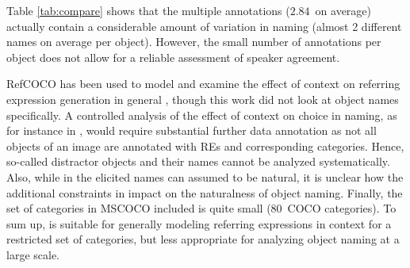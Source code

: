 Table \ref{tab:compare} shows that the multiple annotations ($2.84$\ on average) actually contain a considerable amount of variation in naming (almost 2 different names on average per object). However, the small number of annotations per object does not allow for a reliable assessment of speaker agreement. 

RefCOCO has been used to model and examine the effect of context on referring expression generation in general \cite{Yu2016}, though this work did not look at object names specifically. 
A controlled analysis of the effect of context on choice in naming, as for instance in \cite{graf2016animal}, would require substantial further data annotation as not all objects of an image are annotated with REs and corresponding categories. Hence, so-called distractor objects  \cite{krahmer:2012} and their names cannot be analyzed systematically.
Also, while in  the elicited names can assumed to be natural, it is unclear how the additional constraints in  impact on the naturalness of object naming.
Finally, the set of categories in MSCOCO included is quite small ($80$~COCO categories).
To sum up,  is suitable for generally modeling referring expressions in context for a restricted set of categories, but less appropriate for analyzing object naming at a large scale.


